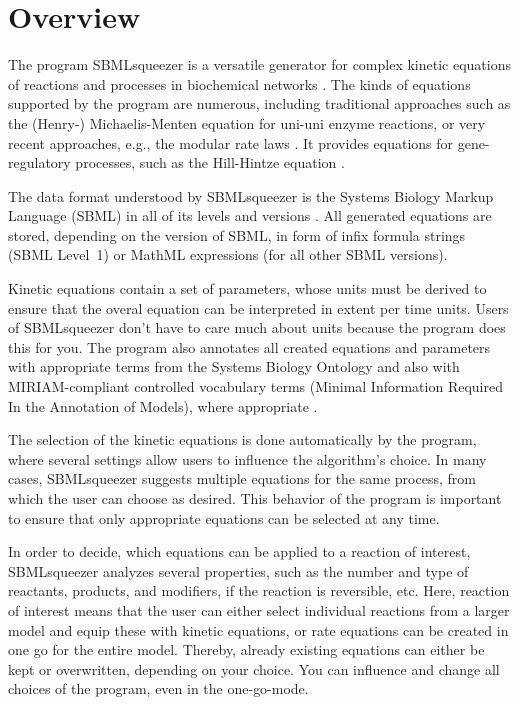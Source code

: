 \chapter{Overview}

The program SBMLsqueezer is a versatile generator for complex kinetic equations
of reactions and processes in biochemical networks \citep{Draeger2008,
Draeger2010a, Draeger2011a}. The kinds of equations supported by the program are
numerous, including traditional approaches such as the (Henry-) Michaelis-Menten
equation \citep{Michaelis1913} for uni-uni enzyme reactions, or very recent
approaches, e.g., the modular rate laws \citep{Liebermeister2010}. It provides
equations for gene-regulatory processes, such as the Hill-Hintze equation
\citep{Hinze2007}.
\nocite{Savageau1969, Segel1993, Heinrich1996, Weaver1999, Bisswanger2000,
Cornish-Bowden2004, Liebermeister2006, Toepfer2007, Vu2007, Radde2007a}

The data format understood by SBMLsqueezer is the Systems Biology Markup
Language (SBML) in all of its levels and versions \citep{Hucka2001, Hucka2003,
M.Hucka03012003, Hucka2007, Hucka2008, Hucka2010a, Finney2003, Finney2006}.
All generated equations are stored, depending on the version of SBML, in form of
infix formula strings (SBML Level~1) or MathML \citep{Buswell1999} expressions
(for all other SBML versions).

Kinetic equations contain a set of parameters, whose units must be derived to
ensure that the overal equation can be interpreted in extent per time units.
Users of SBMLsqueezer don't have to care much about units because the program
does this for you. The program also annotates all created equations and
parameters with appropriate terms from the Systems Biology Ontology and also
with MIRIAM-compliant controlled vocabulary terms (Minimal Information Required
In the Annotation of Models), where appropriate \citep{Le2005, Novere2006b,
Laible2007, Courtot2011}.

The selection of the kinetic equations is done automatically by the program,
where several settings allow users to influence the algorithm's choice.
In many cases, SBMLsqueezer suggests multiple equations for the same process,
from which the user can choose as desired. This behavior of the program is
important to ensure that only appropriate equations can be selected at any time.

In order to decide, which equations can be applied to a reaction of interest,
SBMLsqueezer analyzes several properties, such as the number and type of
reactants, products, and modifiers, if the reaction is reversible, etc.
Here, reaction of interest means that the user can either select individual
reactions from a larger model and equip these with kinetic equations, or rate
equations can be created in one go for the entire model.
Thereby, already existing equations can either be kept or overwritten, depending
on your choice.
You can influence and change all choices of the program, even in the one-go-mode.

